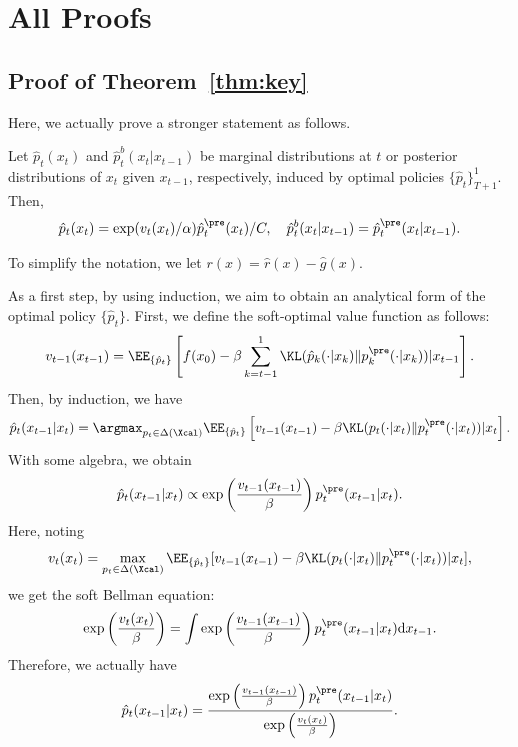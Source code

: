 \section{All Proofs}


\subsection{Proof of Theorem~\ref{thm:key}}\label{thm:key_proof}

Here, we actually prove a stronger statement as follows. 

\begin{theorem}\label{thm:key2}
Let $\hat p_t(x_t)$ and $\hat p^b_{t}(x_{t}| x_{t-1})$ be  marginal distributions at $t$ or posterior distributions of $x_{t}$ given $x_{t-1}$, respectively, induced by optimal policies $\{\hat p_t\}_{T+1}^1$. Then, 
\begin{align*}
    \hat p_t(x_t) =  \exp(v_{t}(x_{t})/\alpha)\hat p^{\pre}_{t}(x_{t})/C,\quad \hat p^b_t(x_{t}|x_{t-1}) = \hat p^{\pre}_t(x_{t}|x_{t-1}). 
\end{align*}
\end{theorem}  

 To simplify the notation, we let $r(x) =  \hat r(x)- \hat g(x)$. 

 As a first step, by using induction, we aim to obtain an analytical form of the optimal policy $\{\hat p_t\}$. First, we define the soft-optimal value function as follows: 
\begin{align*}
v_{t-1}(x_{t-1})  = \EE_{\{\hat p_t\} }\left[f(x_0) - \beta \sum_{k=t-1}^1 \KL(\hat p_k(\cdot|x_k) \|p^{\pre}_k(\cdot|x_k)) | x_{t-1} \right]. 
\end{align*}
Then, by induction, we have 
\begin{align*}
 \hat p_t(x_{t-1}|x_t) =\argmax_{ p_t \in \Delta(\Xcal) } \EE_{\{\hat p_t\} }\left [ v_{t-1}(x_{t-1}) - \beta \KL(p_t(\cdot|x_t) \|p^{\pre}_t(\cdot|x_t)) |x_t \right].   
\end{align*}
With some algebra, we obtain 
\begin{align*}
\hat p_t(x_{t-1}|x_t) \propto \exp\left(\frac{v_{t-1}(x_{t-1}) }{\beta} \right)  p^{\pre}_t(x_{t-1}|x_t) . 
\end{align*}
Here, noting 
\begin{align*}
 v_t(x_t) =\max_{p_t \in \Delta(\Xcal) } \EE_{\{\hat p_t\} }[ v_{t-1}(x_{t-1}) - \beta \KL(p_t(\cdot|x_t) \|p^{\pre}_t(\cdot|x_t)) |x_t ],
\end{align*}
we get the soft Bellman equation:
\begin{align*}
  \exp\left(\frac{v_{t}(x_{t}) }{\beta} \right)  = \int \exp\left(\frac{v_{t-1}(x_{t-1}) }{ \beta} \right)  p^{\pre}_t(x_{t-1}|x_t) \mathrm{d}x_{t-1}. 
\end{align*}
Therefore, we actually have 
\begin{align}\label{eq:soft_formulation}
 \hat p_t(x_{t-1}|x_t)=\frac{ \exp\left(\frac{v_{t-1}(x_{t-1}) }{\beta} \right) p^{\pre}_t(x_{t-1}|x_t)}{  \exp\left(\frac{v_{t}(x_{t}) }{\beta} \right)   } .
\end{align}

